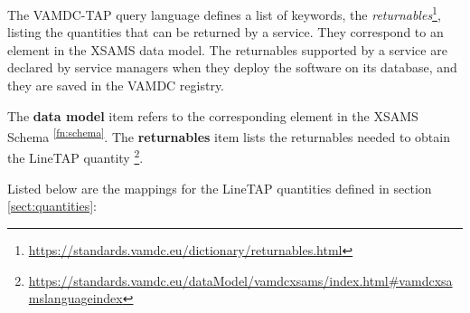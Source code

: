 \documentclass[11pt,a4paper]{ivoa}
\newcommand{\footref}[1]{\textsuperscript{\ref{#1}}}
\begin{document}
The VAMDC-TAP query language defines a list of keywords, the
\textit{returnables}\footnote{\url{https://standards.vamdc.eu/dictionary/returnables.html}},
listing the quantities that can be returned by a service. They correspond
to an element in the XSAMS data model.  The returnables supported by a
service are declared by service managers when they deploy the software
on its database, and they are saved in the VAMDC registry.

The \textbf{data model} item refers to the corresponding element in the XSAMS Schema
\footref{fn:schema}.
The \textbf{returnables} item lists the returnables needed to obtain the LineTAP quantity
\footnote{\url{https://standards.vamdc.eu/dataModel/vamdcxsams/index.html\#vamdcxsamslanguageindex}}. 

Listed below are the mappings for the LineTAP quantities defined in section
\ref{sect:quantities}:%
\end{document}
